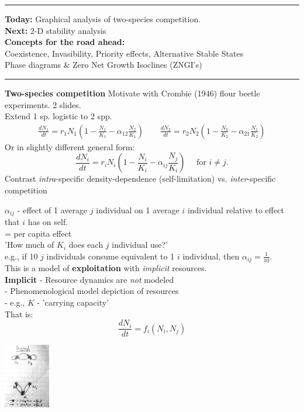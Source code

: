 \documentclass{article}
\newcommand{\note}[1]{\colorbox{gray!30}{#1}}
\newcommand{\ind}{\-\hspace{1cm}}
\begin{document}
\noindent{}

\rule[0.5ex]{\linewidth}{1pt}
\textbf{Today:} Graphical analysis of two-species competition.\\
\textbf{Next:} 2-D stability analysis\\
\textbf{Concepts for the road ahead:}\\
\ind Coexistence, Invasibility, Priority effects, Alternative Stable States\\
\ind Phase diagrams \& Zero Net Growth Isoclines (ZNGI's) \\
\rule[0.5ex]{\linewidth}{1pt}

\textbf{Two-species competition} \ind \note{Motivate with Crombie (1946) flour beetle experiments. 2 slides.}\\
Extend 1 sp. logistic to 2 spp.
\begin{align*}
	\frac{dN_1}{dt}=r_1 N_1 \left (1-\frac{N_1}{K_1} - \alpha_{12}\frac{N_2}{K_1}\right) \quad \quad
	\frac{dN_2}{dt}=r_2 N_2 \left (1-\frac{N_2}{K_2} - \alpha_{21}\frac{N_1}{K_2}\right)
\end{align*}
Or in slightly different general form:
\begin{equation*}
	\frac{dN_i}{dt}=r_i N_i \left (1-\frac{N_i}{K_i} - \alpha_{ij}\frac{N_j}{K_i}\right) \quad \mbox{ for } i \neq j.
\end{equation*}
Contrast \emph{intra}-specific density-dependence (self-limitation) vs. \emph{inter}-specific competition

$\alpha_{ij}$ - effect of 1 average $j$ individual on 1 average $i$ individual relative to effect that $i$ has on self.\\
\ind \ind  = per capita effect\\
\ind \ind 'How much of $K_i$ does each $j$ individual use?'\\
\ind \ind \ind e.g., if 10 $j$ individuals consume equivalent to 1 $i$ individual, then $\alpha_{ij}=\tfrac{1}{10}$.\\

This is a model of \textbf{exploitation} with \emph{implicit} resources.\\
\textbf{Implicit} - Resource dynamics are \emph{not} modeled\\
\ind \ind - Phenomenological model depiction of resources\\
\ind \ind - e.g., $K$ - 'carrying capacity'\\
That is:
\begin{equation*}
	\frac{dN_i}{dt}=f_i(N_i,N_j)
\end{equation*}
\begin{center}
\includegraphics[width=2cm]{figs/Digraph_implicit.pdf}
\end{center}
\end{document}
